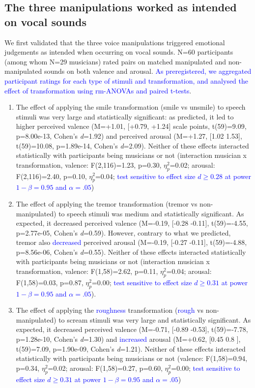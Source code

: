 \documentclass[openacc]{rsprocb_new}%
\begin{document}
\subsection{The three manipulations worked as intended on vocal sounds}

We first validated that the three voice manipulations triggered emotional judgements as intended when occurring on vocal sounds. N=60 participants (among whom N=29 musicians) rated pairs on matched manipulated and non-manipulated sounds on both valence and arousal. \textcolor{blue}{As preregistered, we aggregated participant ratings for each type of stimuli and transformation, and analysed the effect of transformation using rm-ANOVAs and paired t-tests}.  

\begin{enumerate}
    \item The effect of applying the smile transformation (smile vs unsmile) to speech stimuli was very large and statistically significant: as predicted, it led to higher perceived valence (M=+1.01, [+0.79, +1.24] scale points, t(59)=9.09, p=8.00e-13, Cohen's \emph{d}=1.92) and perceived arousal (M=+1.27, [1.02 1.53], t(59)=10.08, p=1.89e-14, Cohen's \emph{d}=2.09). Neither of these effects interacted statistically with participants being musicians or not (interaction musician x transformation, valence: F(2,116)=1.23, p=0.30, $\eta_p^2$=0.02; arousal: F(2,116)=2.40, p=0.10, $\eta_p^2$=0.04; \textcolor{blue}{test sensitive to effect size $d\geq0.28$ at power $1-\beta=0.95$ and $\alpha=.05$})
    
    \item The effect of applying the tremor transformation (tremor vs non-manipulated) to speech stimuli was medium and statistically significant. As expected, it decreased perceived valence (M=-0.19, [-0.28 -0.11], t(59)=-4.55, p=2.77e-05, Cohen's \emph{d}=0.59). However, contrary to what we predicted, tremor also \textcolor{blue}{decreased} perceived arousal (M=-0.19, [-0.27 -0.11], t(59)=-4.88, p=8.56e-06, Cohen's \emph{d}=0.55). Neither of these effects interacted statistically with participants being musicians or not (interaction musician x transformation, valence: F(1,58)=2.62, p=0.11, $\eta_p^2$=0.04; arousal: F(1,58)=0.03, p=0.87, $\eta_p^2$=0.00; \textcolor{blue}{test sensitive to effect size $d\geq0.31$ at power $1-\beta=0.95$ and $\alpha=.05$}).
    
    \item The effect of applying the \textcolor{blue}{roughness} transformation (\textcolor{blue}{rough} vs non-manipulated) to scream stimuli was very large and statistically significant. As expected, it decreased perceived valence (M=-0.71, [-0.89 -0.53], t(59)=-7.78, p=1.28e-10, Cohen's \emph{d}=1.30) and \textcolor{blue}{increased} arousal (M=+0.62, [0.45 0.8 ], t(59)=7.09, p=1.90e-09, Cohen's \emph{d}=1.21). Neither of these effects interacted statistically with participants being musicians or not (valence: F(1,58)=0.94, p=0.34, $\eta_p^2$=0.02; arousal: F(1,58)=0.27, p=0.60, $\eta_p^2$=0.00; \textcolor{blue}{test sensitive to effect size $d\geq0.31$ at power $1-\beta=0.95$ and $\alpha=.05$})

\end{enumerate}
\end{document}
